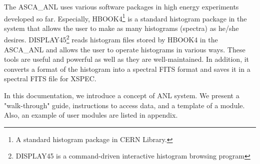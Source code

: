 The ASCA\_ANL uses various software packages
in high energy experiments developed so far.
Especially, HBOOK4\footnote{
A standard histogram  package in CERN Library.
}
is a standard histogram package in the system
that allows the user to make as many histograms (spectra) as he/she desires.  
DISPLAY45\footnote{
DISPLAY45 is a command-driven interactive histogram browsing program
} reads histogram files stored by HBOOK4 in the ASCA\_ANL
and allows the user to operate histograms in various ways.
These tools are useful and powerful
as well as they are well-maintained.
In addition,
it converts a format of the histogram into a spectral FITS format
and saves it in a spectral FITS file for XSPEC.


In this documentation, we introduce a concept of ANL system.
We present a "walk-through" guide,
instructions to access data,
and a template of a module.
Also, an example of user modules are listed in appendix.

